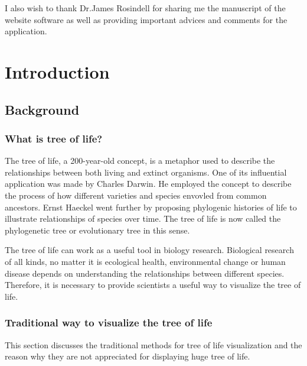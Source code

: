 \documentclass[MSc]{icldt}
\begin{document}
I also wish to thank Dr.James Rosindell for sharing me the manuscript of the website software as well as providing important advices and comments for the application.


\makededication

\tableofcontents
\listoftables
\listoffigures

\chapter{Introduction}

\section{Background}

\subsection{What is tree of life?}
The tree of life, a 200-year-old concept,  is a metaphor used to describe the relationships between both living and extinct organisms. One of its influential application was made by Charles Darwin. He employed the concept to describe the process of how different varieties and species envovled  from common ancestors. Ernst Haeckel went further by proposing phylogenic histories of life to illustrate relationships of species over time. The tree of life is now called the phylogenetic tree or evolutionary tree in this sense. ~\cite{treeOfLifeDefine} ~\cite{phylogeneticTree}


The tree of life can work as a useful tool in biology research. Biological research of all kinds, no matter it is ecological health, environmental change or human disease depends on understanding the relationships between different species. ~\cite{treeOfLifeDefine} Therefore, it is necessary to provide scientists a useful way to visualize the tree of life.

\subsection{Traditional way to visualize the tree of life}

This section discusses the traditional methods for tree of life visualization and the reason why they are not appreciated for displaying huge tree of life.
\end{document}
